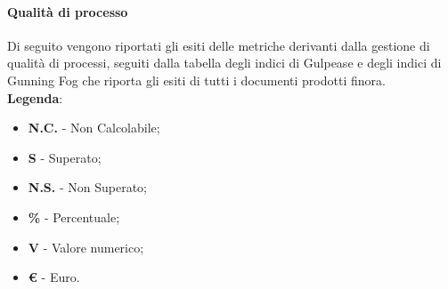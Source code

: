 		\paragraph{Qualità di processo}
		Di seguito vengono riportati gli esiti delle metriche derivanti dalla gestione di qualità di processi, seguiti dalla tabella degli indici di Gulpease e degli indici di Gunning Fog che riporta gli esiti di tutti i documenti prodotti finora. \\
\textbf{Legenda}:
\begin{itemize}
	\item \textbf{N.C.} - Non Calcolabile;
	\item \textbf{S} - Superato;
	\item \textbf{N.S.} - Non Superato;
	\item \textbf{\%} - Percentuale;
	\item \textbf{V} - Valore numerico;
	\item \textbf{\euro{}} - Euro.
\end{itemize}
